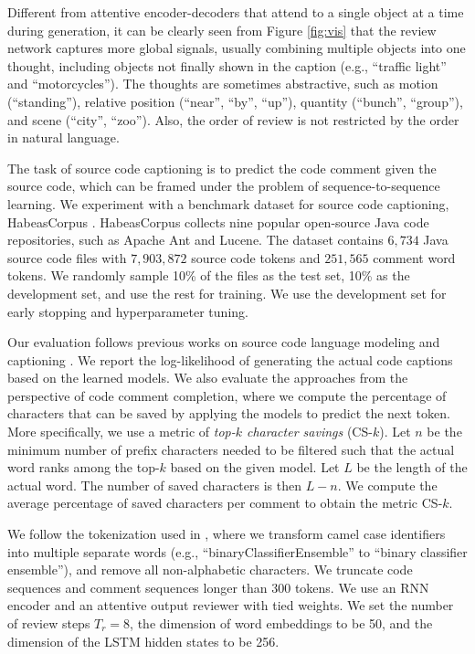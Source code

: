 \documentclass{article}
\begin{document}
Different from attentive encoder-decoders \cite{xu2015show} that attend to a single object at a time during generation, it can be clearly seen from Figure \ref{fig:vis} that the review network captures more global signals, usually combining multiple objects into one thought, including objects not finally shown in the caption (e.g., ``traffic light'' and ``motorcycles''). The thoughts are sometimes abstractive, such as motion (``standing''), relative position (``near'', ``by'', ``up''), quantity (``bunch'', ``group''), and scene (``city'', ``zoo''). Also, the order of review is not restricted by the order in natural language.


The task of source code captioning is to predict the code comment given the source code, which can be framed under the problem of sequence-to-sequence learning. We experiment with a benchmark dataset for source code captioning, HabeasCorpus \cite{movshovitz2013natural}. HabeasCorpus collects nine popular open-source Java code repositories, such as Apache Ant and Lucene. The dataset contains $6,734$ Java source code files with $7,903,872$ source code tokens and $251,565$ comment word tokens. We randomly sample 10\% of the files as the test set, 10\% as the development set, and use the rest for training. We use the development set for early stopping and hyperparameter tuning.

Our evaluation follows previous works on source code language modeling \cite{maddison2014structured} and captioning \cite{movshovitz2013natural}. We report the log-likelihood of generating the actual code captions based on the learned models. We also evaluate the approaches from the perspective of code comment completion, where we compute the percentage of characters that can be saved by applying the models to predict the next token. More specifically, we use a metric of \textit{top-$k$ character savings}\cite{movshovitz2013natural} (CS-$k$). Let $n$ be the minimum number of prefix characters needed to be filtered such that the actual word ranks among the top-$k$ based on the given model. Let $L$ be the length of the actual word. The number of saved characters is then $L - n$. We compute the average percentage of saved characters per comment to obtain the metric CS-$k$.

We follow the tokenization used in \cite{movshovitz2013natural}, where we transform camel case identifiers into multiple separate words (e.g., ``binaryClassifierEnsemble'' to ``binary classifier ensemble''), and remove all non-alphabetic characters. We truncate code sequences and comment sequences longer than 300 tokens.
We use an RNN encoder and an attentive output reviewer with tied weights. We set the number of review steps $T_r = 8$, the dimension of word embeddings to be 50, and the dimension of the LSTM hidden states to be 256.
\end{document}
